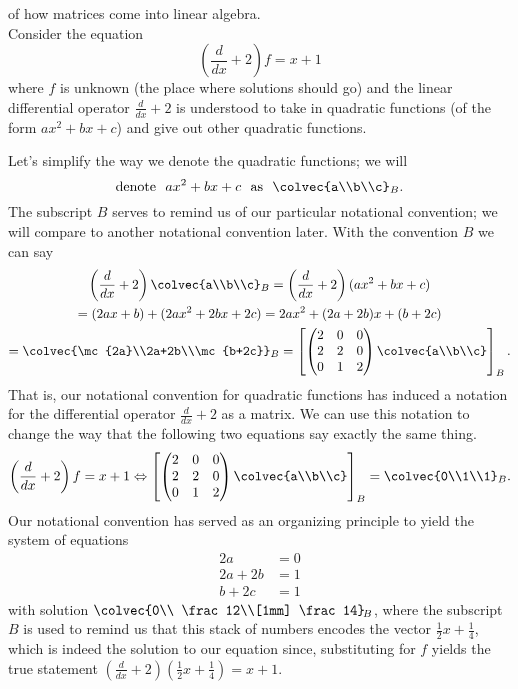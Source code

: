 \begin{example}{of how matrices come into linear algebra.}\\
Consider the equation
\[\left( \frac{d}{dx}+2\right) f= x+1\]
where $f$ is unknown (the place where solutions should go) and  the linear differential operator $\frac{d}{dx}+2$ is understood to take in quadratic functions (of the form $ax^2+bx+c$) and give out other quadratic functions. 

Let's simplify the way we denote the quadratic functions; 
we will  
\[\text{denote~~}ax^2+bx+c \text{~~as~~} \colvec{a\\b\\c}_B.\]
The subscript $B$ serves to remind us of our particular notational convention; we will compare to another notational convention later. With the convention $B$ we can say
\begin{gather*}  \left( \frac{d}{dx}+2\right) \colvec{a\\b\\c}_B
=\left( \frac{d}{dx}+2\right)(ax^2+bx+c)\\
=(2ax+b)+(2ax^2+2bx+2c) = 2a x^2+(2a+2b)x+(b+2c)
\\
=\colvec{\mc{2a}\\2a+2b\\\mc{b+2c}}_B
= 
\left[ 
\begin{pmatrix}   
2&0&0\\
2&2&0\\
0&1&2
\end{pmatrix}
\colvec{a\\b\\c}\right]_B.
\end{gather*}
That is, our notational convention for quadratic functions has induced a notation for the differential operator $\frac{d}{dx}+2$ as a matrix. 
We can use this notation to change the way that 
the following two equations say exactly the same thing.
\[
 \left( \frac{d}{dx}+2\right) f=x+1
 \Leftrightarrow
\left[ 
\begin{pmatrix}   
2&0&0\\
2&2&0\\
0&1&2
\end{pmatrix}
\colvec{a\\b\\c}\right]_B = \colvec{0\\1\\1}_B.\]
Our notational convention has served as an organizing principle to yield the system of equations 
\[
\begin{array}{cc}
2a&=0\\
2a+2b&=1\\
b+2c&=1
\end{array}
\]
with solution $\colvec{0\\ \frac12\\[1mm] \frac14}_{\!B}  $, where the subscript $B$ is used to remind us that this stack of numbers  encodes the vector $\frac12x+\frac14$, which is indeed the  solution to our equation since, substituting for $f$ yields the true statement $\left(\frac{d}{dx}+2\right)(\frac12x+\frac14)=x+1$. 
\end{example}

